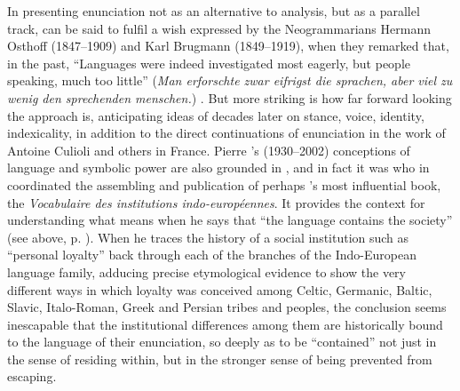 \documentclass[output=paper]{langscibook}
\begin{document}
In presenting enunciation not as an alternative to  analysis, but as a parallel track, {\Benveniste} can be said to fulfil a wish expressed by the Neogrammarians Hermann Osthoff (1847--1909) and Karl Brugmann (1849--1919), when they remarked that, in the past, ``Languages were indeed investigated most eagerly, but people speaking, much too little'' (\emph{Man erforschte zwar eifrigst die \emph{spra\-chen}, aber viel zu wenig \emph{den sprechenden menschen}.}) \citep[iii]{OsthoffBrugmann1878}. But more striking is how far forward looking the approach is, anticipating ideas of decades later on stance, voice, identity, indexicality, in addition to the direct continuations of enunciation in the work of Antoine Culioli and others in France. Pierre {\Bourdieu}'s (1930--2002) conceptions of language and symbolic power are also grounded in {\Benveniste}, and in fact it was {\Bourdieu} who in \citeyear{Benveniste1969vocabulaire} coordinated the assembling and publication of perhaps {\Benveniste}'s most influential book, the \emph{Vocabulaire des institutions indo-européennes}. It provides the context for understanding what {\Benveniste} means when he says that ``the language contains the society'' (see above, p. \pageref{q:joseph:langcontainssoc}). When he traces the history of a social institution such as ``personal loyalty'' back through each of the branches of the Indo-European language family, adducing precise etymological evidence to show the very different ways in which loyalty was conceived among Celtic, Germanic, Baltic, Slavic, Italo-Roman, Greek and Persian tribes and peoples, the conclusion seems inescapable that the institutional differences among them are historically bound to the language of their enunciation, so deeply as to be ``contained'' not just in the sense of residing within, but in the stronger sense of being prevented from escaping.
\end{document}
